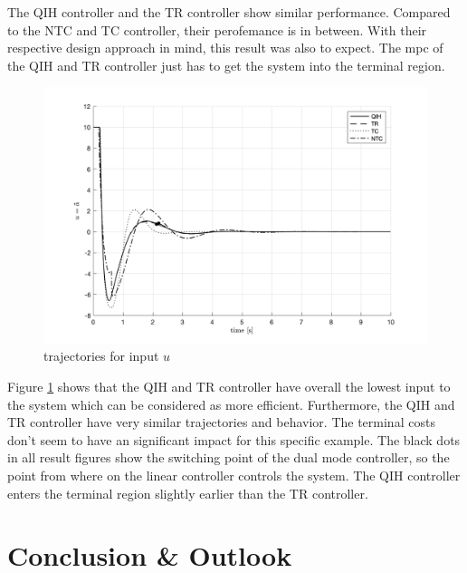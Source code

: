 \documentclass[10pt,a4paper]{article}
\begin{document}
The QIH controller and the TR controller show similar performance. Compared to the NTC and TC controller, their perofemance is in between. With their respective 
design approach in mind, this result was also to expect. The \gls{mpc} of the QIH and TR controller just has to get the system into the terminal region.

\begin{figure}[h]
	\begin{center}
		\includegraphics[width=\textwidth]{img/bb_time_u.png}
		\caption{trajectories for input $u$}
		\label{pic:bb_time_u}
	\end{center}
\end{figure}

Figure \ref{pic:bb_time_u} shows that the QIH and TR controller have overall the lowest input to the system which can be considered as more efficient. 
Furthermore, the QIH and TR controller have very similar
trajectories and behavior. The terminal costs don't seem to have an significant impact for this specific example. The black dots in all result figures show the
switching point of the dual mode controller, so the point from where on the linear controller controls the system. The QIH controller enters the terminal region
slightly earlier than the TR controller. 


\section{Conclusion \& Outlook}
\label{sec:conclusion}

\end{document}
